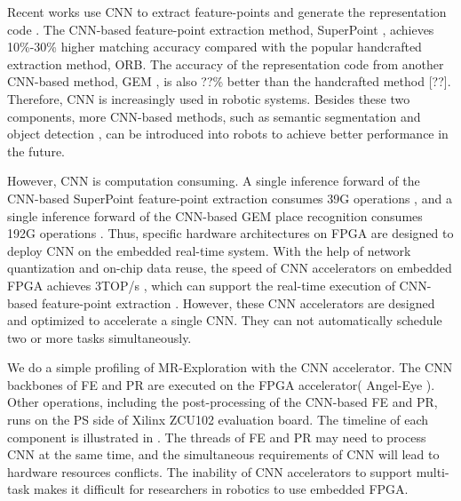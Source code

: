 Recent works use CNN to extract feature-points \cite{detone2018superpoint, simo2015discriminative, yi2016lift} and generate the representation code \cite{arandjelovic2016netvlad, radenovic2018fine}. 
The CNN-based feature-point extraction method, SuperPoint \cite{detone2018superpoint}, achieves 10\%-30\% higher matching accuracy compared with the popular handcrafted extraction method, ORB\cite{Mur-Artal:2017281}.
The accuracy of the representation code from another CNN-based method, GEM \cite{radenovic2018fine}, is also ??\% better than the handcrafted method [??].
Therefore, CNN is increasingly used in robotic systems. 
Besides these two components, more CNN-based methods, such as semantic segmentation \cite{long2015fully} and object detection \cite{ren2015faster}, can be introduced into robots to achieve better performance in the future.

However, CNN is computation consuming. A single inference forward of the CNN-based SuperPoint feature-point extraction consumes 39G operations \cite{detone2018superpoint}, and a single inference forward of the CNN-based GEM \cite{radenovic2018fine} place recognition consumes 192G operations \cite{radenovic2018fine}.
Thus, specific hardware architectures on FPGA \cite{guo2017angel,yu2018instruction,li_high_2016,qiu2016going,lu_evaluating_2017} are designed to deploy CNN on the embedded real-time system.
With the help of network quantization and on-chip data reuse, the speed of CNN accelerators on embedded FPGA achieves 3TOP/s \cite{lu_evaluating_2017}, which can support the real-time execution of CNN-based feature-point extraction \cite{detone2018superpoint}.
However, these CNN accelerators are designed and optimized to accelerate a single CNN. They can not automatically schedule two or more tasks simultaneously. 





We do a simple profiling of MR-Exploration with the CNN accelerator. The CNN backbones of FE and  PR are executed on the FPGA accelerator( Angel-Eye\cite{guo2017angel} ).
Other operations, including the post-processing of the CNN-based FE and PR, runs on the PS side of Xilinx ZCU102 evaluation board\cite{zcu102}. The timeline of each component is illustrated in . 
The threads of FE and PR may need to process CNN at the same time,  and the simultaneous requirements of CNN will lead to hardware resources conflicts. The inability of CNN accelerators to support multi-task makes it difficult for researchers in robotics to use embedded FPGA.

